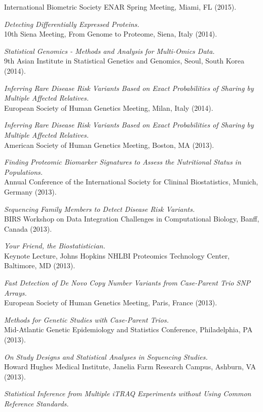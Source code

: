 \documentclass[10pt]{article}
\newcommand{\dn}[1]{{\color{black} {#1}}}
\begin{document}
International Biometric Society ENAR Spring Meeting, \dn{Miami, FL}
(2015).
\item
{\it Detecting Differentially Expressed Proteins.}\\
10th Siena Meeting, From Genome to Proteome, Siena, Italy
(2014).
\item
{\it Statistical Genomics - Methods and Analysis for Multi-Omics Data.}\\
9th Asian Institute in Statistical Genetics and Genomics, Seoul, South Korea 
(2014).
\item
{\it Inferring Rare Disease Risk Variants Based on Exact Probabilities of Sharing by Multiple Affected Relatives.}\\
European Society of Human Genetics Meeting, Milan, Italy
(2014).
\item
{\it Inferring Rare Disease Risk Variants Based on Exact Probabilities of Sharing by Multiple Affected Relatives.}\\
American Society of Human Genetics Meeting, Boston, MA
(2013).
\item
{\it Finding Proteomic Biomarker Signatures to Assess the Nutritional Status in Populations.}\\
Annual Conference of the International Society for Clininal Biostatistics, \dn{Munich, Germany}
(2013).
\item
{\it Sequencing Family Members to Detect Disease Risk Variants.}\\
BIRS Workshop on Data Integration Challenges in Computational Biology, \dn{Banff, Canada}
(2013).
\item
{\it Your Friend, the Biostatistician.}\\
Keynote Lecture, Johns Hopkins NHLBI Proteomics Technology Center, \dn{Baltimore, MD}
(2013).
\item
{\it Fast Detection of De Novo Copy Number Variants from Case-Parent Trio SNP Arrays.}\\
European Society of Human Genetics Meeting, Paris, France
(2013).
\item
{\it Methods for Genetic Studies with Case-Parent Trios.}\\
Mid-Atlantic Genetic Epidemiology and Statistics Conference, \dn{Philadelphia, PA}
(2013).
\item
{\it On Study Designs and Statistical Analyses in Sequencing Studies.}\\
Howard Hughes Medical Institute, Janelia Farm Research Campus, \dn{Ashburn, VA}
(2013).
\item
{\it Statistical Inference from Multiple iTRAQ Experiments without Using Common Reference Standards.}\\
\end{document}
